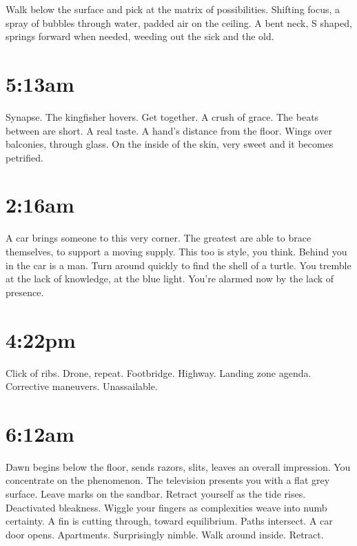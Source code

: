 \documentclass[
]{memoir}
\begin{document}
Walk below the surface and pick at the matrix of possibilities. Shifting
focus, a spray of bubbles through water, padded air on the ceiling. A
bent neck, S shaped, springs forward when needed, weeding out the sick
and the old.

\hypertarget{am-6}{%
\section*{5:13am}\label{am-6}}

Synapse. The kingfisher hovers. Get together. A crush of grace. The
beats between are short. A real taste. A hand's distance from the floor.
Wings over balconies, through glass. On the inside of the skin, very
sweet and it becomes petrified.

\hypertarget{am-7}{%
\section*{2:16am}\label{am-7}}

A car brings someone to this very corner. The greatest are able to brace
themselves, to support a moving supply. This too is style, you think.
Behind you in the car is a man. Turn around quickly to find the shell of
a turtle. You tremble at the lack of knowledge, at the blue light.
You're alarmed now by the lack of presence.

\hypertarget{pm}{%
\section*{4:22pm}\label{pm}}

Click of ribs. Drone, repeat. Footbridge. Highway. Landing zone agenda.
Corrective maneuvers. Unassailable.

\hypertarget{am-8}{%
\section*{6:12am}\label{am-8}}

Dawn begins below the floor, sends razors, slits, leaves an overall
impression. You concentrate on the phenomenon. The television presents
you with a flat grey surface. Leave marks on the sandbar. Retract
yourself as the tide rises. Deactivated bleakness. Wiggle your fingers
as complexities weave into numb certainty. A fin is cutting through,
toward equilibrium. Paths intersect. A car door opens. Apartments.
Surprisingly nimble. Walk around inside. Retract.
\end{document}
